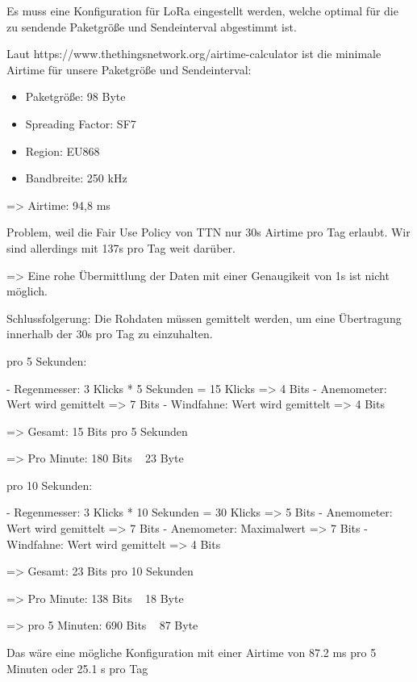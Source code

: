 \documentclass{article}
\begin{document}
      Es muss eine Konfiguration für LoRa eingestellt werden, welche optimal für die zu sendende Paketgröße und Sendeinterval abgestimmt ist.

      Laut https://www.thethingsnetwork.org/airtime-calculator ist die minimale Airtime für unsere Paketgröße und Sendeinterval:

      \begin{itemize}
        \item Paketgröße: 98 Byte
        \item Spreading Factor: SF7
        \item Region: EU868
        \item Bandbreite: 250 kHz
      \end{itemize}

      => Airtime: 94,8 ms

      Problem, weil die Fair Use Policy von TTN nur 30s Airtime pro Tag erlaubt. Wir sind allerdings mit 137s pro Tag weit darüber.

      => Eine rohe Übermittlung der Daten mit einer Genaugikeit von 1s ist nicht möglich.

      Schlussfolgerung: Die Rohdaten müssen gemittelt werden, um eine Übertragung innerhalb der 30s pro Tag zu einzuhalten.

      
      pro 5 Sekunden:

      - Regenmesser: 3 Klicks * 5 Sekunden = 15 Klicks => 4 Bits
      - Anemometer: Wert wird gemittelt => 7 Bits
      - Windfahne: Wert wird gemittelt => 4 Bits

      => Gesamt: 15 Bits pro 5 Sekunden

      => Pro Minute: 180 Bits ~ 23 Byte


      pro 10 Sekunden:

      - Regenmesser: 3 Klicks * 10 Sekunden = 30 Klicks => 5 Bits
      - Anemometer: Wert wird gemittelt => 7 Bits
      - Anemometer: Maximalwert => 7 Bits
      - Windfahne: Wert wird gemittelt => 4 Bits

      => Gesamt: 23 Bits pro 10 Sekunden

      => Pro Minute: 138 Bits ~ 18 Byte

      => pro 5 Minuten: 690 Bits ~ 87 Byte

      Das wäre eine mögliche Konfiguration mit einer Airtime von 87.2 ms pro 5 Minuten oder 25.1 s pro Tag
      

        
\end{document}

